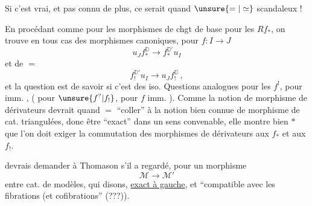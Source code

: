 Si c'est vrai, et pas connu de plus, ce serait quand $\unsure{=|\simeq}$ scandaleux !

En procédant comme pour les morphismes de chgt de base pour les $Rf_*$, on trouve en tous cas des morphismes canoniques, pour $f:I\longrightarrow J$
\[
u_J f_*^{\mathbb D}\longrightarrow f_*^{\mathbb D'}u_I
\]
et de $=$
\[
f_!^{\mathbb D'}u_I\longrightarrow u_J f_!^{\mathbb D}\,,
\]
et la question est de savoir si c'est des iso.
Questions analogues pour les $f^!$, pour imm. , ( pour $\unsure{f^?|f_!}$, pour $f$ imm. ). Comme la notion de morphisme de dérivateurs devrait quand $=$ ``coller'' à la notion bien connue de morphisme  de cat. triangulées, donc être ``exact'' dans un sens convenable, elle montre bien $*$ que l'on doit exiger la commutation des  morphismes de dérivateurs aux $f_*$ et aux $f_!$.

 devrais demander à Thomason s'il a regardé, pour un morphisme
\[
\mathcal M\longrightarrow\mathcal M'
\]
entre cat. de modèles, qui   disons, \uline{exact à gauche}, et ``compatible avec les  fibrations (et cofibrations'' (???)).

